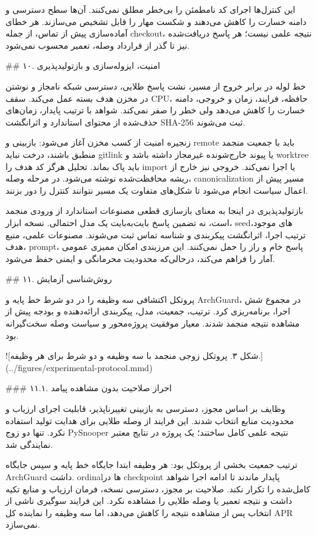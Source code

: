\documentclass[11pt,a4paper]{article}
\begin{document}
این کنترل‌ها اجرای کد نامطمئن را بی‌خطر مطلق نمی‌کنند. آن‌ها سطح دسترسی و دامنه خسارت را کاهش می‌دهند
و شکست مهار را قابل تشخیص می‌سازند. هر خطای آماده‌سازی پیش از تماس، از جمله checkout، نتیجه علمی نیست؛
هر پاسخ دریافت‌شده نیز تا گذر از قرارداد وصله، تعمیر محسوب نمی‌شود.

\#\# ۱۰. امنیت، ایزوله‌سازی و بازتولیدپذیری

خط لوله در برابر خروج از مسیر، نشت پاسخ طلایی، دسترسی شبکه نامجاز و نوشتن در مخزن هدف بسته عمل می‌کند.
سقف CPU، حافظه، فرایند، زمان و خروجی، دامنه خسارت را کاهش می‌دهد ولی خطر را صفر نمی‌کند. شواهد با
ترتیب پایدار، زمان‌های حذف‌شده از محتوای استاندارد و اثرانگشت SHA-256 ثبت می‌شوند.

زنجیره امنیت از کسب مخزن آغاز می‌شود: بازبینی و remote باید با جمعیت منجمد منطبق باشند، درخت نباید
gitlink یا پیوند خارج‌شونده غیرمجاز داشته باشد و worktree باید پاک بماند. تحلیل هرگز کد هدف را import
یا اجرا نمی‌کند. خروجی نیز خارج از ریشه محافظت‌شده نوشته می‌شود. در مرحله وصله، canonicalization مسیر
پیش از اعمال سیاست انجام می‌شود تا شکل‌های متفاوت یک مسیر نتوانند کنترل را دور بزنند.

بازتولیدپذیری در اینجا به معنای بازسازی قطعی مصنوعات استاندارد از ورودی منجمد است، نه تضمین پاسخ
بایت‌به‌بایت یک مدل احتمالی. نسخه ابزار، seedهای موجود، ترتیب اجرا، اثرانگشت پیکربندی و شناسه تماس ثبت
می‌شوند. مصنوعات علمی، منبع هدف، prompt، پاسخ خام و راز را حمل نمی‌کنند. این مرزبندی امکان ممیزی عمومی
آمار را فراهم می‌کند، درحالی‌که محدودیت محرمانگی و ایمنی حفظ می‌شود.

\#\# ۱۱. روش‌شناسی آزمایش

پروتکل اکتشافی سه وظیفه را در دو شرط خط پایه و ArchGuard، در مجموع شش اجرا، برنامه‌ریزی کرد. ترتیب،
جمعیت، مدل، پیکربندی ارائه‌دهنده و بودجه پیش از مشاهده نتیجه منجمد شدند. معیار موفقیت پروژه‌محور و
سیاست وصله سخت‌گیرانه بود.

![شکل ۳. پروتکل زوجی منجمد با سه وظیفه و دو شرط برای هر وظیفه.](../figures/experimental-protocol.mmd)

\#\#\# ۱۱.۱. احراز صلاحیت بدون مشاهده پیامد

وظایف بر اساس مجوز، دسترسی به بازبینی تغییرناپذیر، قابلیت اجرای ارزیاب و محدودیت منابع انتخاب شدند.
این فرایند از وصله طلایی برای هدایت تولید استفاده نکرد. تنها دو زوج PySnooper نتیجه علمی کامل ساختند؛
یک پروژه در نتایج معتبر نمایندگی شد.

ترتیب جمعیت بخشی از پروتکل بود: هر وظیفه ابتدا جایگاه خط پایه و سپس جایگاه ArchGuard داشت. ordinalها
در checkpoint پایدار ماندند تا ادامه اجرا شواهد کامل‌شده را تکرار نکند. صلاحیت بر مجوز، دسترسی نسخه،
فرمان ارزیاب و منابع تکیه داشت و نتیجه تعمیر یا وصله طلایی را مشاهده نکرد. این فرایند سوگیری ناشی از
انتخاب پس از مشاهده نتیجه را کاهش می‌دهد، اما سه وظیفه را نماینده کل APR نمی‌سازد.
\end{document}
